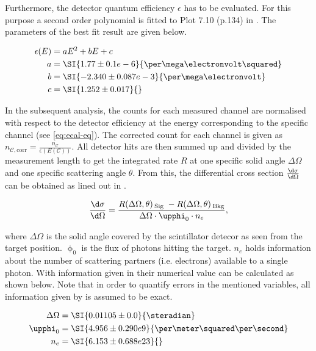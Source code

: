 Furthermore, the detector quantum efficiency $\epsilon$ has to be evaluated. For this
purpose a second order polynomial is fitted to Plot 7.10 (p.134) in \cite{Sch17}. The
parameters of the best fit result are given below.

\begin{align*}
\label{eq:eq:efficiency-parameters}
	\epsilon(E) &= a E^2 + b E + c \\
	a &= \SI{1.77 \pm 0.1 e-6}{\per\mega\electronvolt\squared} \\
	b &= \SI{-2.340 \pm 0.087 e-3}{\per\mega\electronvolt} \\
	c &= \SI{1.252 \pm 0.017}{}
\end{align*}

In the subsequent analysis, the counts for each measured channel are normalised with
respect to the detector efficiency at the energy corresponding to the specific
channel (see \autoref{eq:ecal-eq}). The corrected count for each channel is given as 
$n_{\mathcal{C},\text{corr}}  = \frac{n_\mathcal{C}}{\epsilon( E(\mathcal{C}) )}$. 
All detector hits are then summed up and divided by the measurement length to get the
integrated rate $R$ at one specific solid angle $\Delta\Omega$ and one specific 
scattering angle $\theta$. From this, the differential cross section 
$\frac{\d\sigma}{\d\Omega}$ can be obtained as lined out in \cite{Sch17}.

\begin{equation}
\label{eq:diff-cross-section-experimental}
	\frac{\d\sigma}{\d\Omega} = \frac{R(\Delta\Omega,\theta)\,_\text{Sig}\;-R(\Delta\Omega,\theta)\,_\text{Bkg}}{\Delta\Omega \cdot \upphi_0 \cdot n_e},
\end{equation}

where $\Delta\Omega$ is the solid angle covered by the scintillator detecor as seen
from the target position. $\upphi_0$ is the flux of photons hitting the target. $n_e$
holds information about the number of scattering partners (i.e. electrons) available
to a single photon. With information given in \cite{Sch17} their numerical value can 
be calculated as shown below. Note that in order to quantify errors in the mentioned 
variables, all information given by \cite{Sch17} is assumed to be exact.

\begin{align*}
	\Delta\Omega &= \SI{0.01105 \pm 0.0}{\steradian} \\
	\upphi_0 &= \SI{4.956 \pm 0.290 e9}{\per\meter\squared\per\second} \\
	n_e &= \SI{6.153 \pm 0.688 e23}{} \\
\end{align*}

